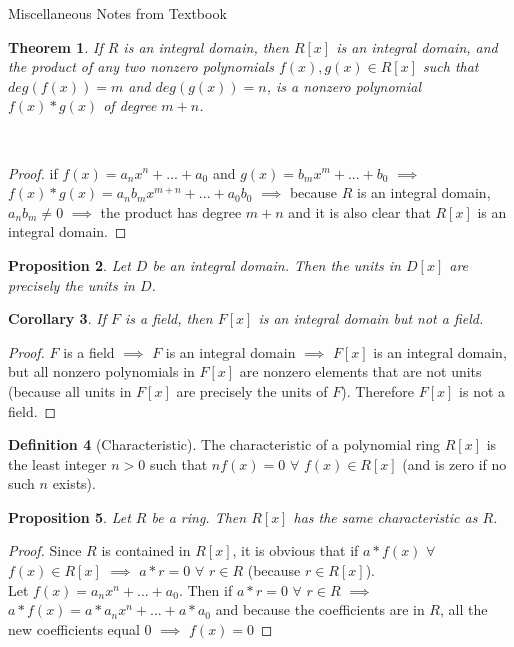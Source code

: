 \documentclass[11pt]{article}
\newtheorem{thm}{Theorem}[section]
\newtheorem{prop}[thm]{Proposition}
\newtheorem{cor}[thm]{Corollary}
\theoremstyle{definition}
\newtheorem{definition}[thm]{Definition}
\numberwithin{equation}{section}
\begin{document}
\begin{center}
{\sf\LARGE Miscellaneous Notes from Textbook}
\end{center}

\begin{thm}
If $R$ is an integral domain, then $R[x]$ is an integral domain, and the product of any two nonzero polynomials $f(x), g(x) \in R[x]$ such that $deg(f(x)) = m$ and $deg(g(x)) = n$, is a nonzero polynomial $f(x)*g(x)$ of degree $m+n$.
\end{thm} \\
\begin{proof}
if $f(x) = a_{n}x^{n}+...+a_{0}$ and $g(x) = b_{m}x^{m}+...+b_{0}$ $\implies$ $f(x)*g(x) = a_{n}b_{m}x^{m+n}+...+a_{0}b_{0}$ $\implies$ because $R$ is an integral domain, $a_{n}b_{m} \neq 0$ $\implies$ the product has degree $m+n$ and it is also clear that $R[x]$ is an integral domain.
\end{proof}

\begin{prop}
 Let $D$ be an integral domain. Then the units in $D[x]$ are precisely the units in $D$.
\end{prop}

\begin{cor}
If $F$ is a field, then $F[x]$ is an integral domain but not a field.
\end{cor}
\begin{proof}
$F$ is a field $\implies$ $F$ is an integral domain $\implies$ $F[x]$ is an integral domain, but all nonzero polynomials in $F[x]$ are nonzero elements that are not units (because all units in $F[x]$ are precisely the units of $F$). Therefore $F[x]$ is not a field.
\end{proof}

 \begin{definition}[Characteristic]
 The characteristic of a polynomial ring $R[x]$ is the least integer $n > 0$ such that $nf(x) = 0$ $\forall$ $f(x) \in R[x]$ (and is zero if no such $n$ exists).
 \end{definition}

 \begin{prop}
  Let $R$ be a ring. Then $R[x]$ has the same characteristic as $R$.
 \end{prop}

 \begin{proof}
 Since $R$ is contained in $R[x]$, it is obvious that if $a*f(x)$ $\forall$ $f(x) \in R[x]$ $\implies$ $a*r = 0$ $\forall$ $r \in R$ (because $r \in R[x]$). \\
 Let $f(x) = a_{n}x^{n}+...+a_{0}$. Then if $a*r = 0$ $\forall$ $r \in R$ $\implies$ $a*f(x) = a*a_{n}x^{n}+...+a*a_{0}$ and because the coefficients are in $R$, all the new coefficients equal $0$ $\implies$ $f(x) = 0$
 \end{proof}
\end{document}
